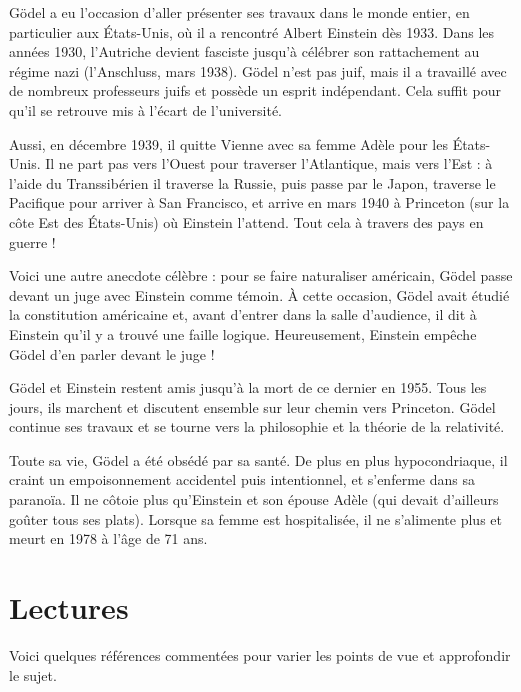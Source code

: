 \documentclass[11pt,class=report,crop=false]{standalone}
\begin{document}
Gödel a eu l'occasion d'aller présenter ses travaux dans le monde entier, en particulier aux États-Unis, où il a rencontré Albert Einstein dès 1933. Dans les années 1930, l'Autriche devient fasciste jusqu'à célébrer son rattachement au régime nazi (l'Anschluss, mars 1938). Gödel n'est pas juif, mais il a travaillé avec de nombreux professeurs juifs et possède un esprit indépendant. Cela suffit pour qu'il se retrouve mis à l'écart de l'université.
\medskip

Aussi, en décembre 1939, il quitte Vienne avec sa femme Adèle pour les États-Unis. Il ne part pas vers l'Ouest pour traverser l'Atlantique, mais vers l'Est : à l'aide du Transsibérien il traverse la Russie, puis passe par le Japon, traverse le Pacifique pour arriver à San Francisco, et arrive en mars 1940 à Princeton (sur la côte Est des États-Unis) où Einstein l'attend. Tout cela à travers des pays en guerre !
\medskip

Voici une autre anecdote célèbre : pour se faire naturaliser américain, Gödel passe devant un juge avec Einstein comme témoin. À cette occasion, Gödel avait étudié la constitution américaine et, avant d'entrer dans la salle d'audience, il dit à Einstein qu'il y a trouvé une faille logique. Heureusement, Einstein empêche Gödel d'en parler devant le juge !
\medskip

Gödel et Einstein restent amis jusqu'à la mort de ce dernier en 1955. Tous les jours, ils marchent et discutent ensemble sur leur chemin vers Princeton. Gödel continue ses travaux et se tourne vers la philosophie et la théorie de la relativité.
\medskip

Toute sa vie, Gödel a été obsédé par sa santé. De plus en plus hypocondriaque, il craint un empoisonnement accidentel puis intentionnel, et s'enferme dans sa paranoïa. Il ne côtoie plus qu'Einstein et son épouse Adèle (qui devait d'ailleurs goûter tous ses plats). Lorsque sa femme est hospitalisée, il ne s'alimente plus et meurt en 1978 à l'âge de 71 ans.


\section*{Lectures}

Voici quelques références commentées pour varier les points de vue et approfondir le sujet. 
\end{document}
